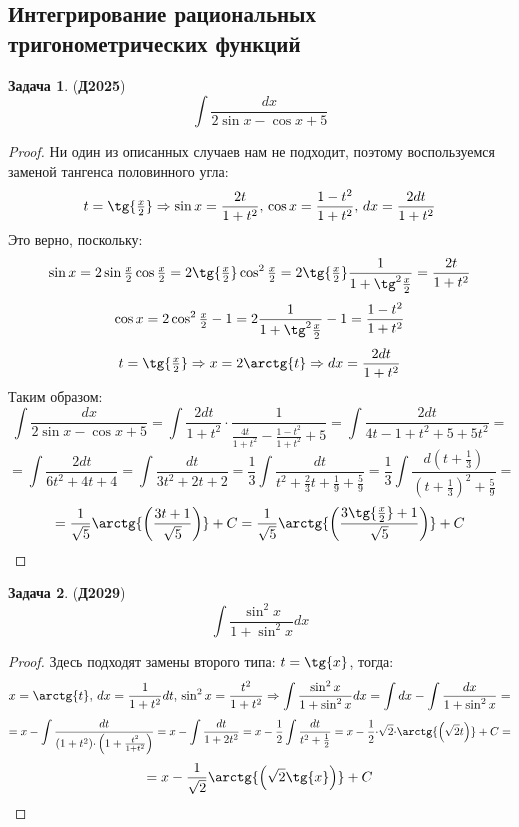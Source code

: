 \documentclass[12pt]{article}
\theoremstyle{definition}
\newtheorem{problem}{Задача}
\DeclareMathOperator{\dint}{\displaystyle\int}
\begin{document}
\subsection*{Интегрирование рациональных тригонометрических функций}
\begin{problem}(\textbf{Д2025})
	$$
		\dint \dfrac{dx}{2 \sin{x} - \cos{x} + 5}
	$$
\end{problem}
\begin{proof}
	Ни один из описанных случаев нам не подходит, поэтому воспользуемся заменой тангенса половинного угла:
	$$
		t = \tg{\tfrac{x}{2}} \Rightarrow \sin{x} = \dfrac{2t}{1 + t^2}, \, \cos{x} = \dfrac{1 -t^2}{1 + t^2}, \, dx = \dfrac{2dt}{1 + t^2}
	$$
	Это верно, поскольку:
	$$
		\sin{x} = 2\sin{\tfrac{x}{2}}\cos{\tfrac{x}{2}} = 2 \tg{\tfrac{x}{2}}\cos^2{\tfrac{x}{2}} = 2 \tg{\tfrac{x}{2}}\dfrac{1}{1 + \tg^2{\tfrac{x}{2}}} = \dfrac{2t}{1 + t^2}
	$$
	$$
		\cos{x} = 2\cos^2{\tfrac{x}{2}} - 1 = 2 \dfrac{1}{1 + \tg^2{\tfrac{x}{2}}} - 1 = \dfrac{1 - t^2}{1 + t^2}
	$$
	$$
		t = \tg{\tfrac{x}{2}} \Rightarrow x = 2\arctg{t} \Rightarrow dx = \dfrac{2dt}{1 + t^2}
	$$
	Таким образом:
	$$
		\dint \dfrac{dx}{2 \sin{x} - \cos{x} + 5} = \dint \dfrac{2dt}{1 + t^2}{\cdot}\dfrac{1}{\tfrac{4t}{1 + t^2} - \tfrac{1 - t^2}{1+ t^2} + 5} = \dint \dfrac{2dt}{4t - 1 + t^2 + 5 + 5t^2} = 
	$$
	$$
		=	\dint \dfrac{2dt}{6t^2  + 4t + 4} = \dint \dfrac{dt}{3t^2 + 2t + 2} = 
		\dfrac{1}{3}\dint\dfrac{dt}{t^2 + \tfrac{2}{3}t + \tfrac{1}{9} + \tfrac{5}{9}} = \dfrac{1}{3}\dint \dfrac{d\left(t + \tfrac{1}{3}\right)}{\left(t + \tfrac{1}{3}\right)^2 + \tfrac{5}{9}} =
	$$
	$$
		= \dfrac{1}{\sqrt{5}}\arctg{\left(\dfrac{3t + 1}{\sqrt{5}}\right)} + C = \dfrac{1}{\sqrt{5}}\arctg{\left(\dfrac{3\tg{\tfrac{x}{2}} + 1}{\sqrt{5}}\right)} + C
	$$
\end{proof}
\newpage
\begin{problem}(\textbf{Д2029})
	$$
		\dint \dfrac{\sin^2{x}}{1 + \sin^2{x}}dx
	$$
\end{problem}
\begin{proof}
	Здесь подходят замены второго типа: $t = \tg{x}$, тогда:
	$$
		x = \arctg{t}, \, dx = \dfrac{1}{1 + t^2}dt, \, \sin^2{x} = \dfrac{t^2}{1 +t^2} \Rightarrow \dint \dfrac{\sin^2{x}}{1 + \sin^2{x}}dx= \dint dx - \dint \dfrac{dx}{1 + \sin^2{x}} =
	$$
	$$
		= x - \dint \dfrac{dt}{(1 + t^2){\cdot}\left(1 + \tfrac{t^2}{1+t^2}\right)} = x - \dint\dfrac{dt}{1 + 2t^2} = x - \dfrac{1}{2}\dint\dfrac{dt}{t^2 + \tfrac{1}{2}} = x - \dfrac{1}{2}{\cdot}\sqrt{2}{\cdot}\arctg{\left(\sqrt{2}t\right)} + C =
	$$
	$$
		= x -\dfrac{1}{\sqrt{2}}\arctg{\left(\sqrt{2}\tg{x}\right)} + C
	$$
\end{proof}
\end{document}
